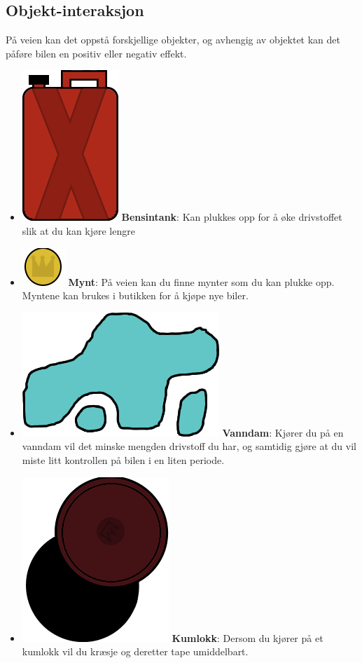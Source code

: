 \documentclass[paper=a4]{article}
\begin{document}
\subsection{Objekt-interaksjon}
På veien kan det oppstå forskjellige objekter, og avhengig av objektet kan det påføre bilen en positiv eller negativ effekt. \\
{\renewcommand\labelitemi{}
\begin{itemize}
	\item \includegraphics[scale=0.2]{images/gastank.png} \textbf{Bensintank}: Kan plukkes opp for å øke drivstoffet slik at du kan kjøre lengre 
	\item \includegraphics[scale=0.5]{images/coin.png} \textbf{Mynt}: På veien kan du finne mynter som du kan plukke opp.
																Myntene kan brukes i butikken for å kjøpe nye biler.
	\item \includegraphics[scale=0.2]{images/puddle.png} \textbf{Vanndam}: Kjører du på en vanndam vil det minske mengden drivstoff du har,
																og samtidig gjøre at du vil miste litt kontrollen på bilen i en liten periode. 
	\item \includegraphics[scale=0.2]{images/manhole.png} \textbf{Kumlokk}: Dersom du kjører på et kumlokk vil du kræsje og deretter tape umiddelbart.

\end{itemize}}
\end{document}
